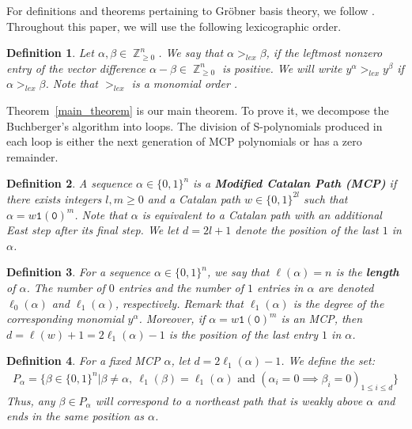 \documentclass[10pt,a4paper]{article}
\newtheorem{definition}{Definition}[section]
\DeclareMathOperator{\Z}{\mathbb{Z}}
\begin{document}
For definitions and theorems pertaining to Gr\"obner basis theory, we follow \cite{iva}.  Throughout this paper, we will use the following lexicographic order.
\begin{definition} \label{lex}
	Let $\alpha, \beta \in \Z^n_{\geq 0}$. We say that $\alpha >_{lex} \beta$, if the leftmost nonzero entry of the vector difference $\alpha - \beta \in \Z^n_{\geq 0}$ is positive. 
	We will write $y^\alpha >_{lex} y^\beta$ if $\alpha >_{lex} \beta$. Note that $>_{lex}$ is a monomial order \cite[\S2 \textemdash Proposition 4]{iva}. 
\end{definition}

Theorem~\ref{main_theorem} is our main theorem. To prove it, we decompose the Buchberger's algorithm into loops. The division of S-polynomials produced in each loop is either the next generation of MCP polynomials  or has a zero remainder.
\begin{definition}  \label{MCP}
	A sequence  $\alpha \in \{0,1\}^n$ is a {\bf Modified Catalan Path (MCP)} if there exists integers $l,m\ge 0$ and a Catalan path $w \in \{0,1\}^{2l}$ such that $\alpha = w\texttt{1}(\texttt{0})^m$.
	Note that $\alpha$ is equivalent to a Catalan path with an additional East step after its final step. We let $d=2l+1$ denote the position of the last $1$ in $\alpha$.
\end{definition}
\begin{definition}  \label{pathlength}
	For a sequence $\alpha \in \{0,1\}^n$, we say that $\ell(\alpha)=n$ is the {\bf length} of $\alpha$. The number of  $0$ entries and the number of $1$ entries in $\alpha$ are denoted $	\ell_0(\alpha)$ and $\ell_1(\alpha)$, respectively. Remark that $\ell_1(\alpha)$ is the degree of the corresponding monomial $y^{\alpha}$. Moreover, if $\alpha= w\texttt{1}(\texttt{0})^m$ is an MCP, then 
	$d = \ell(w)+1 =2\ell_1(\alpha)-1$ is the position of the last entry $1$ in $\alpha$.
\end{definition} 
\begin{definition} \label{p_alpha}
	For a fixed MCP $\alpha$, let $d=2\ell_1(\alpha)-1$. We define the set:
	\begin{align*}
		P_{\alpha} = \big\{ \beta \in \{0,1\}^n \big| \beta \neq \alpha,\  \ell_1(\beta)=\ell_1(\alpha) \text{ and } (\alpha_i = 0 \implies \beta_i = 0)_{1 \leq i \leq d}\big\}
	\end{align*}
	Thus, any $\beta \in P_\alpha$ will correspond to a northeast path that is weakly above $\alpha$ and ends in the same position as $\alpha$.
\end{definition}
\end{document}
